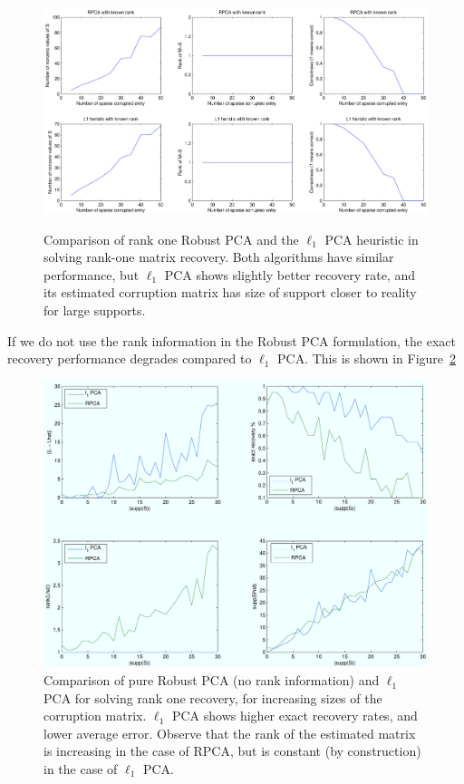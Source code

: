 \begin{figure}[h!]
\centering
\includegraphics[width=\textwidth]{../figures/compare.pdf}
\label{fig:l1pca_vs_rankone_rpca}
\caption{Comparison of rank one Robust PCA and the $\ell_1$ PCA heuristic in solving rank-one matrix recovery. Both algorithms have similar performance, but $\ell_1$ PCA shows slightly better recovery rate, and its estimated corruption matrix has size of support closer to reality for large supports.}
\end{figure}

If we do not use the rank information in the Robust PCA formulation, the exact recovery performance degrades compared to $\ell_1$ PCA. This is shown in Figure~\ref{fig:l1pca_vs_pure_rpca}

\begin{figure}[h!]
\label{fig:l1pca_vs_pure_rpca}
\centering
\includegraphics[width=\textwidth]{../figures/l1pca_rk1_rpca_vs_l1pca.pdf}
\caption{Comparison of pure Robust PCA (no rank information) and $\ell_1$ PCA for solving rank one recovery, for increasing sizes of the corruption matrix. $\ell_1$ PCA shows higher exact recovery rates, and lower average error. Observe that the rank of the estimated matrix is increasing in the case of RPCA, but is constant (by construction) in the case of $\ell_1$ PCA.}
\end{figure}


